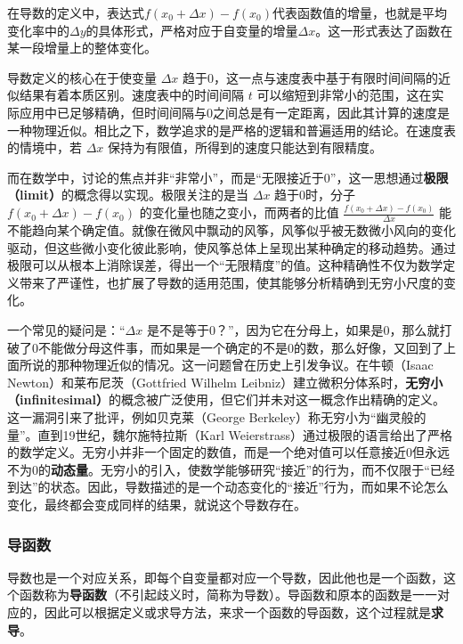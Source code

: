 在导数的定义中，表达式$f(x_0+\Delta x)-f(x_0)$代表函数值的增量，也就是平均变化率中的$\Delta y$的具体形式，严格对应于自变量的增量$\Delta x$。这一形式表达了函数在某一段增量上的整体变化。

导数定义的核心在于使变量 $\Delta x$ 趋于0，这一点与速度表中基于有限时间间隔的近似结果有着本质区别。速度表中的时间间隔 $t$ 可以缩短到非常小的范围，这在实际应用中已足够精确，但时间间隔与0之间总是有一定距离，因此其计算的速度是一种物理近似。相比之下，数学追求的是严格的逻辑和普遍适用的结论。在速度表的情境中，若 $\Delta x$ 保持为有限值，所得到的速度只能达到有限精度。

而在数学中，讨论的焦点并非“非常小”，而是“无限接近于0”，这一思想通过\textbf{极限（limit）}的概念得以实现。极限关注的是当 $\Delta x$ 趋于0时，分子 $f(x_0 + \Delta x) - f(x_0)$ 的变化量也随之变小，而两者的比值 $\frac{f(x_0 + \Delta x) - f(x_0)}{\Delta x}$ 能不能趋向某个确定值。就像在微风中飘动的风筝，风筝似乎被无数微小风向的变化驱动，但这些微小变化彼此影响，使风筝总体上呈现出某种确定的移动趋势。通过极限可以从根本上消除误差，得出一个“无限精度”的值。这种精确性不仅为数学定义带来了严谨性，也扩展了导数的适用范围，使其能够分析精确到无穷小尺度的变化。

一个常见的疑问是：“$\Delta x$ 是不是等于0？”，因为它在分母上，如果是0，那么就打破了0不能做分母这件事，而如果是一个确定的不是0的数，那么好像，又回到了上面所说的那种物理近似的情况。这一问题曾在历史上引发争议。在牛顿（Isaac Newton）和莱布尼茨（Gottfried Wilhelm Leibniz）建立微积分体系时，\textbf{无穷小（infinitesimal）}的概念被广泛使用，但它们并未对这一概念作出精确的定义。这一漏洞引来了批评，例如贝克莱（George Berkeley）称无穷小为“幽灵般的量”。直到19世纪，魏尔施特拉斯（Karl Weierstrass）通过极限的语言给出了严格的数学定义。无穷小并非一个固定的数值，而是一个绝对值可以任意接近0但永远不为0的\textbf{动态量}。无穷小的引入，使数学能够研究“接近”的行为，而不仅限于“已经到达”的状态。因此，导数描述的是一个动态变化的“接近”行为，而如果不论怎么变化，最终都会变成同样的结果，就说这个导数存在。

\subsubsection{导函数}

导数也是一个对应关系，即每个自变量都对应一个导数，因此他也是一个函数，这个函数称为\textbf{导函数}（不引起歧义时，简称为导数）。导函数和原本的函数是一一对应的，因此可以根据定义或求导方法，来求一个函数的导函数，这个过程就是\textbf{求导}。

